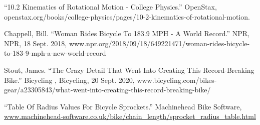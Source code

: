 \documentclass{article}
\begin{document}
\pagebreak

\noindent

\begin{thebibliography}{4}
“10.2 Kinematics of Rotational Motion - College Physics.” OpenStax,  
openstax.org/books/college-physics/pages/10-2-kinematics-of-rotational-motion.  

Chappell, Bill. “Woman Rides Bicycle To 183.9 MPH - A World Record.” NPR, NPR, 18 Sept.  2018,  
www.npr.org/2018/09/18/649221471/woman-rides-bicycle-to-183-9-mph-a-new-world-record

Stout, James. “The Crazy Detail That Went Into Creating This Record-Breaking Bike.” Bicycling , Bicycling, 20 Sept. 2020,  
www.bicycling.com/bikes-gear/a23305843/what-went-into-creating-this-record-breaking-bike/

“Table Of Radius Values For Bicycle Sprockets.” Machinehead Bike Software,  
\url{www.machinehead-software.co.uk/bike/chain_length/sprocket_radius_table.html}

\end{thebibliography}
\end{document}
